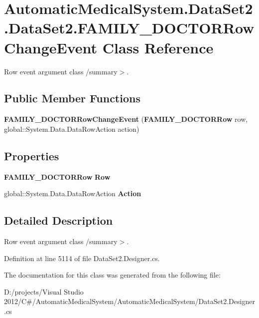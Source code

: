 \section{AutomaticMedicalSystem.DataSet2.DataSet2.FAMILY\_\-DOCTORRowChangeEvent Class Reference}
\label{class_automatic_medical_system_1_1_data_set2_1_1_f_a_m_i_l_y___d_o_c_t_o_r_row_change_event}
Row event argument class /summary$>$.  


\subsection*{Public Member Functions}
\begin{CompactItemize}
\item 
\textbf{FAMILY\_\-DOCTORRowChangeEvent} ({\bf FAMILY\_\-DOCTORRow} row, global::System.Data.DataRowAction action)\label{class_automatic_medical_system_1_1_data_set2_1_1_f_a_m_i_l_y___d_o_c_t_o_r_row_change_event_465fdcd706381fbf17e54e9733a92c48}

\end{CompactItemize}
\subsection*{Properties}
\begin{CompactItemize}
\item 
{\bf FAMILY\_\-DOCTORRow} \textbf{Row}\hspace{0.3cm}{\tt  [get]}\label{class_automatic_medical_system_1_1_data_set2_1_1_f_a_m_i_l_y___d_o_c_t_o_r_row_change_event_4ef48b53870e60be4f8b56b9e0ae538e}

\item 
global::System.Data.DataRowAction \textbf{Action}\hspace{0.3cm}{\tt  [get]}\label{class_automatic_medical_system_1_1_data_set2_1_1_f_a_m_i_l_y___d_o_c_t_o_r_row_change_event_ab4fef3fe548cfd42faafc0dc12be5a3}

\end{CompactItemize}


\subsection{Detailed Description}
Row event argument class /summary$>$. 

Definition at line 5114 of file DataSet2.Designer.cs.

The documentation for this class was generated from the following file:\begin{CompactItemize}
\item 
D:/projects/Visual Studio 2012/C\#/AutomaticMedicalSystem/AutomaticMedicalSystem/DataSet2.Designer.cs\end{CompactItemize}
